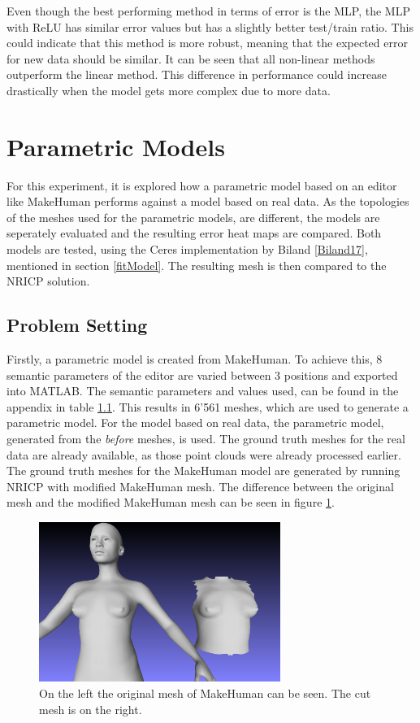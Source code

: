 Even though the best performing method in terms of error is the MLP, the MLP with ReLU has similar error values but has a slightly better test/train ratio. This could indicate that this method is more robust, meaning that the expected error for new data should be similar. It can be seen that all non-linear methods outperform the linear method. This difference in performance could increase drastically when the model gets more complex due to more data.

\section{Parametric Models}
For this experiment, it is explored how a parametric model based on an editor like MakeHuman performs against a model based on real data. As the topologies of the meshes used for the parametric models, are different, the models are seperately evaluated and the resulting error heat maps are compared. Both models are tested, using the Ceres implementation by Biland \ref{Biland17}, mentioned in section \ref{fitModel}. The resulting mesh is then compared to the NRICP solution.
\subsection{Problem Setting}
Firstly, a parametric model is created from MakeHuman. To achieve this, 8 semantic parameters of the editor are varied between 3 positions and exported into MATLAB. The semantic parameters and values used, can be found in the appendix in table \ref{}. %
This results in 6'561 meshes, which are used to generate a parametric model. For the model based on real data, the parametric model, generated from the \textit{before} meshes, is used. The ground truth meshes for the real data are already available, as those point clouds were already processed earlier. The ground truth meshes for the MakeHuman model are generated by running NRICP with modified MakeHuman mesh. The difference between the original mesh and the modified MakeHuman mesh can be seen in figure \ref{fig:mhcut}.

\begin{figure}[h]
\centering
\includegraphics[width=0.7\textwidth]{figures/meshcut00}
\caption[Cut MakeHuman mesh]{On the left the original mesh of MakeHuman can be seen. The cut mesh is on the right.}
\label{fig:mhcut}
\end{figure}

